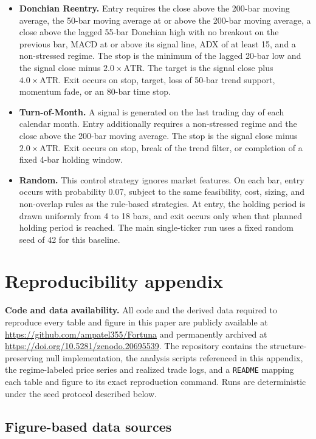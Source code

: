 \documentclass[preprint,12pt]{elsarticle}
\theoremstyle{definition}
\begin{document}
\begin{itemize}
\item \textbf{Donchian Reentry.} Entry requires the close above the 200-bar moving average, the 50-bar moving average at or above the 200-bar moving average, a close above the lagged 55-bar Donchian high with no breakout on the previous bar, MACD at or above its signal line, ADX of at least 15, and a non-stressed regime. The stop is the minimum of the lagged 20-bar low and the signal close minus \(2.0\times \mathrm{ATR}\). The target is the signal close plus \(4.0\times \mathrm{ATR}\). Exit occurs on stop, target, loss of 50-bar trend support, momentum fade, or an 80-bar time stop.

\item \textbf{Turn-of-Month.} A signal is generated on the last trading day of each calendar month. Entry additionally requires a non-stressed regime and the close above the 200-bar moving average. The stop is the signal close minus \(2.0\times \mathrm{ATR}\). Exit occurs on stop, break of the trend filter, or completion of a fixed 4-bar holding window.

\item \textbf{Random.} This control strategy ignores market features. On each bar, entry occurs with probability 0.07, subject to the same feasibility, cost, sizing, and non-overlap rules as the rule-based strategies. At entry, the holding period is drawn uniformly from 4 to 18 bars, and exit occurs only when that planned holding period is reached. The main single-ticker run uses a fixed random seed of 42 for this baseline.
\end{itemize}

\section{Reproducibility appendix}

\textbf{Code and data availability.} All code and the derived data required to reproduce every table and figure in this paper are publicly available at \url{https://github.com/ampatel355/Fortuna} and permanently archived at \url{https://doi.org/10.5281/zenodo.20695539}. The repository contains the structure-preserving null implementation, the analysis scripts referenced in this appendix, the regime-labeled price series and realized trade logs, and a \texttt{README} mapping each table and figure to its exact reproduction command. Runs are deterministic under the seed protocol described below.

\subsection{Figure-based data sources}
\end{document}
